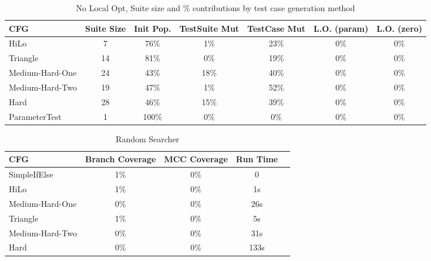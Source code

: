 \documentclass[runningheads]{llncs}
\begin{document}
\begin{table}[h!]
	\begin{center}
		\begin{tabular}{| l | c || c | c | c | c | c |}
			\hline
			CFG             & Suite Size & Init Pop. & TestSuite Mut & TestCase Mut & L.O. (param) & L.O. (zero) \\ \hline
			HiLo            & 7          & 76\%      & 1\%           & 23\%         & 0\%          & 0\%         \\ \hline
			Triangle        & 14         & 81\%      & 0\%           & 19\%         & 0\%          & 0\%         \\ \hline
			Medium-Hard-One & 24         & 43\%      & 18\%          & 40\%         & 0\%          & 0\%         \\ \hline
			Medium-Hard-Two & 19         & 47\%      & 1\%           & 52\%         & 0\%          & 0\%         \\ \hline
			Hard            & 28         & 46\%      & 15\%          & 39\%         & 0\%          & 0\%         \\ \hline
			ParameterTest   & 1          & 100\%     & 0\%           & 0\%          & 0\%          & 0\%         \\ \hline
		\end{tabular}
	\end{center}
	\caption{No Local Opt, Suite size and \% contributions by test case generation method}
	\label{tab:ContribNoLO}
\end{table}




\begin{table}[h!]
\begin{center}
	\begin{tabular}{| l | c | c | c | c |}
		\hline
		CFG             & Branch Coverage & MCC Coverage & Run Time &  \\ \hline
		SimpleIfElse    & 1\%             & 0\%          & 0        &  \\ \hline
		HiLo            & 1\%             & 0\%          & 1s       &  \\ \hline
		Medium-Hard-One & 0\%             & 0\%          & 26s      &  \\ \hline
		Triangle        & 1\%             & 0\%          & 5s       &  \\ \hline
		Medium-Hard-Two & 0\%             & 0\%          & 31s      &  \\ \hline
		Hard            & 0\%             & 0\%          & 133s     &  \\ \hline
	\end{tabular}
\end{center}

\caption{Random Searcher \label{tab:randSrch}}
\end{table}
\end{document}
